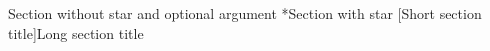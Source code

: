\documentclass{article}
\makeatletter
\newcommand*{\eolsection}{%
  \@ifstar{%
    \eolgrab{\section*}%
  }{%
    \@ifnextchar[{%
      \eoloptsection
    }{%
      \eolgrab\section
    }%
  }%
}
\newcommand*{\eoloptsection}[1][]{%
  \eolgrab{\section[{#1}]}%
}
\makeatother
\begin{document}
\tableofcontents
\eolsection Section without star and optional argument
\eolsection*Section with star
\eolsection[Short section title]Long section title
\end{document}
